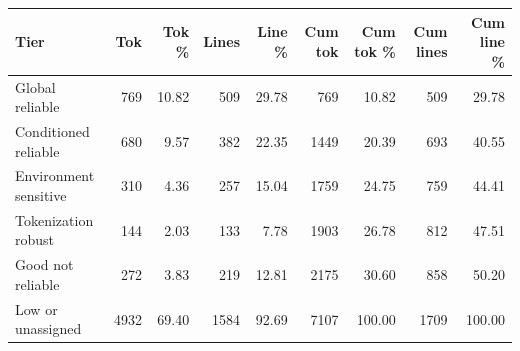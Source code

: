 \begin{tabular}{lrrrrrrrr}
\toprule
Tier & Tok & Tok \% & Lines & Line \% & Cum tok & Cum tok \% & Cum lines & Cum line \% \\
\midrule
Global reliable & 769 & 10.82 & 509 & 29.78 & 769 & 10.82 & 509 & 29.78 \\
Conditioned reliable & 680 & 9.57 & 382 & 22.35 & 1449 & 20.39 & 693 & 40.55 \\
Environment sensitive & 310 & 4.36 & 257 & 15.04 & 1759 & 24.75 & 759 & 44.41 \\
Tokenization robust & 144 & 2.03 & 133 & 7.78 & 1903 & 26.78 & 812 & 47.51 \\
Good not reliable & 272 & 3.83 & 219 & 12.81 & 2175 & 30.60 & 858 & 50.20 \\
Low or unassigned & 4932 & 69.40 & 1584 & 92.69 & 7107 & 100.00 & 1709 & 100.00 \\
\bottomrule
\end{tabular}